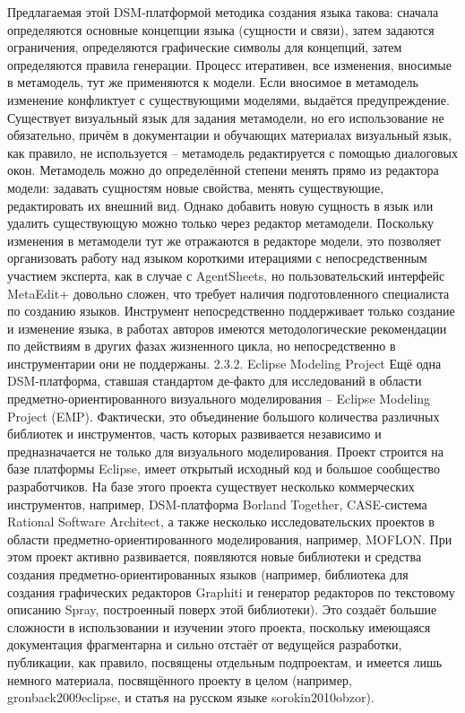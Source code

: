 	Предлагаемая этой DSM-платформой методика создания языка такова: сначала определяются основные концепции языка (сущности и связи), затем задаются ограничения, определяются графические символы для концепций, затем определяются правила генерации. Процесс итеративен, все изменения, вносимые в метамодель, тут же применяются к модели. Если вносимое в метамодель изменение конфликтует с существующими моделями, выдаётся предупреждение. Существует визуальный язык для задания метамодели, но его использование не обязательно, причём в документации и обучающих материалах визуальный язык, как правило, не используется – метамодель редактируется с помощью диалоговых окон. Метамодель можно до определённой степени менять прямо из редактора модели: задавать сущностям новые свойства, менять существующие, редактировать их внешний вид. Однако добавить новую сущность в язык или удалить существующую можно только через редактор метамодели. Поскольку изменения в метамодели тут же отражаются в редакторе модели, это позволяет организовать работу над языком короткими итерациями с непосредственным участием эксперта, как в случае с AgentSheets, но пользовательский интерфейс MetaEdit+ довольно сложен, что требует наличия подготовленного специалиста по созданию языков. Инструмент непосредственно поддерживает только создание и изменение языка, в работах авторов имеются методологические рекомендации по действиям в других фазах жизненного цикла, но непосредственно в инструментарии они не поддержаны.
2.3.2. Eclipse Modeling Project
	Ещё одна DSM-платформа, ставшая стандартом де-факто для исследований в области предметно-ориентированного визуального моделирования – Eclipse Modeling Project (EMP). Фактически, это объединение большого количества различных библиотек и инструментов, часть которых развивается независимо и предназначается не только для визуального моделирования. Проект строится на базе платформы Eclipse, имеет открытый исходный код и большое сообщество разработчиков. На базе этого проекта существует несколько коммерческих инструментов, например, DSM-платформа Borland Together, CASE-система Rational Software Architect, а также несколько исследовательских проектов в области предметно-ориентированного моделирования, например, MOFLON. При этом проект активно развивается, появляются новые библиотеки и средства создания предметно-ориентированных языков (например, библиотека для создания графических редакторов Graphiti и генератор редакторов по текстовому описанию Spray, построенный поверх этой библиотеки). Это создаёт большие сложности в использовании и изучении этого проекта, поскольку имеющаяся документация фрагментарна и сильно отстаёт от ведущейся разработки, публикации, как правило, посвящены отдельным подпроектам, и имеется лишь немного материала, посвящённого проекту в целом (например, gronback2009eclipse, и статья на русском языке sorokin2010obzor).
